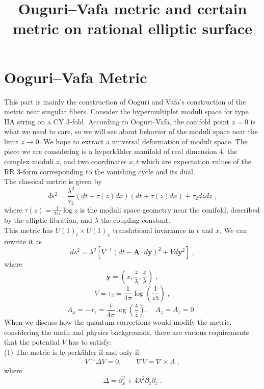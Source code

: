 
\begin{survey}
\label{cha:survey}

\title{Ouguri--Vafa metric and certain metric on rational elliptic surface}
\maketitle


\tableofcontents

\section{Ooguri--Vafa Metric}
This part is mainly the construction of Ooguri and Vafa's construction of the metric near singular fibers\cite{ooguri1996summing}.
Consider the hypermultiplet moduli space for type IIA string on a CY 3-fold. According to Ooguri--Vafa\cite{ooguri1996summing}, the conifold point $z=0$ is what we need to care, so we will see about behavior of the moduli space near the limit $z\rightarrow 0$. We hope to extract a universal deformation of moduli space. The piece we are considering is a  hyperk{\"a}hler manifold of real dimension 4, the complex moduli $z$, and two coordinates $x,t$ which are expectation values of the RR 3-form corresponding to the vanishing cycle and its dual.\\ \indent
The classical metric is given by
$$ds^2=\frac{\lambda^2}{\tau_2}(dt+\tau(z)dx)(dt+\bar{\tau}(\bar{z})dx)+\tau_2dzd\bar{z} \; ,$$
where $\displaystyle \tau(z)=\frac{1}{2\pi i}\log z$ is the moduli space geometry near the conifold, described by the elliptic fibration, and $\lambda$ the coupling constant.\\ \indent
This metric has $U(1)_t\times U(1)_x$ translational invariance in $t$ and $x$. We can rewrite it as
$$ds^2=\lambda^2[V^{-1}(dt-\mathbf{A}\cdot d\mathbf{y})^2+V d\mathbf{y}^2]\; ,$$
where
$$\mathbf{y}=\left(x,\frac{z}{\lambda},\frac{\bar{z}}{\lambda}\right) \; ,$$
$$V=\tau_2=\frac{1}{4\pi}\log\left(\frac{1}{z\bar{z}}\right)\; ,$$
$$A_x=-\tau_1=\frac{i}{4\pi}\log\left(\frac{z}{\bar{z}}\right),\quad A_z=A_{\bar{z}}=0\; .$$
\indent When we discuss how the quantum corrections would modify the metric, considering the math and physics backgrounds, there are various requirements that the potential $V$ has to satisfy:\\ 
(1) The metric is hyperk{\"a}hler if and only if 
$$V^{-1}\Delta V=0,\qquad \nabla V=\nabla \times A\; ,$$
where 
$$\Delta=\partial_x^2+4\lambda^2\partial_z\partial_{\bar{z}}\; .$$

\end{survey}
